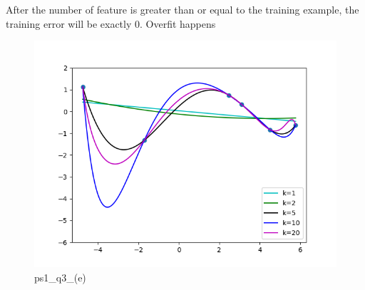 \begin{answer}

After the number of feature is greater than or equal to the training example, the training error will be exactly 0. Overfit happens 
\begin{figure}
    \centering
    \includegraphics[width=0.5\linewidth]{ps1_q3_(e).png}
    \caption{ps1\_q3\_(e)}
    \label{fig:enter-label}
\end{figure}
\end{answer}
